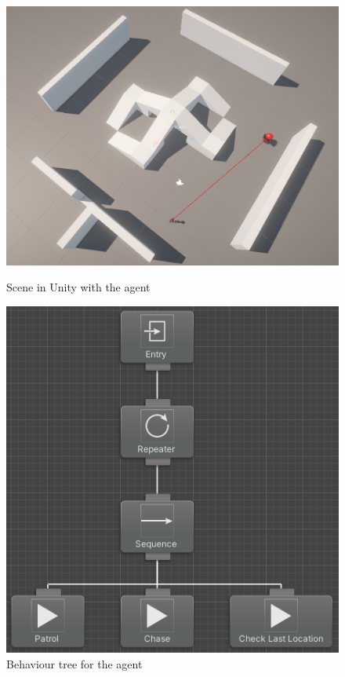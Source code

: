 \begin{figure}[H]
    \centering
    \begin{minipage}{0.49\textwidth}
        \centering
        \includegraphics[scale=0.3]{images/behaviour_tree_scene_agent.png}
        \caption{Scene in Unity with the agent}
        \label{fig:behaviour_tree_scene_agent}
    \end{minipage}
    \begin{minipage}{0.49\textwidth}
        \centering
        \includegraphics[scale=0.49]{images/behaviour_tree_agent.png}
        \caption{Behaviour tree for the agent}
        \label{fig:behaviour_tree_agent}
    \end{minipage}
\end{figure}


